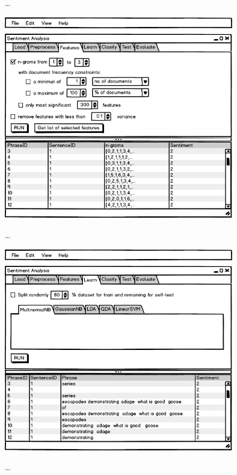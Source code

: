 \ldots

\includegraphics[width=10cm]{gui-3-features}

\ldots

\includegraphics[width=10cm]{gui-4-learn}

\ldots
